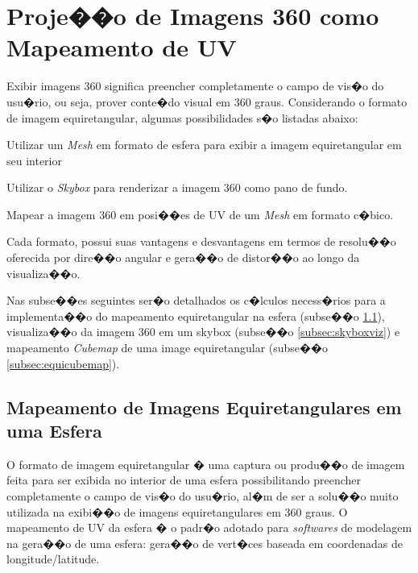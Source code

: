 \documentclass[12pt]{article}
\begin{document}



\section{Proje��o de Imagens 360 como Mapeamento de UV}  \label{sec:imageprojection}

Exibir imagens 360 significa preencher completamente o campo de vis�o do usu�rio, ou seja, prover conte�do visual em 360 graus. Considerando o formato de imagem equiretangular, algumas possibilidades s�o listadas abaixo:

\begin{enumerate}
  \begin{item}Utilizar um \textit{Mesh} em formato de esfera para exibir a imagem equiretangular em seu interior\end{item}
  \begin{item}Utilizar o \textit{Skybox} para renderizar a imagem 360 como pano de fundo.\end{item}
  \begin{item}Mapear a imagem 360 em posi��es de UV de um \textit{Mesh} em formato c�bico.\end{item}
\end{enumerate}

Cada formato, possui suas vantagens e desvantagens em termos de resolu��o oferecida por dire��o angular e gera��o de distor��o ao longo da visualiza��o.

Nas subse��es seguintes ser�o detalhados os c�lculos necess�rios para a implementa��o do mapeamento equiretangular na esfera (subse��o \ref{subsec:equimap}), visualiza��o da imagem 360 em um skybox (subse��o \ref{subsec:skyboxviz}) e mapeamento \textit{Cubemap} de uma image equiretangular (subse��o \ref{subsec:equicubemap}).


\subsection{Mapeamento de Imagens Equiretangulares em uma Esfera} \label{subsec:equimap}

O formato de imagem equiretangular � uma captura ou produ��o de imagem feita para ser exibida no interior de uma esfera possibilitando preencher completamente o campo de vis�o do usu�rio, al�m de ser a solu��o muito utilizada na exibi��o de imagens equiretangulares em 360 graus. O mapeamento de UV da esfera � o padr�o adotado para \textit{softwares} de modelagem na gera��o de uma esfera: gera��o de vert�ces baseada em coordenadas de longitude/latitude.
\end{document}
